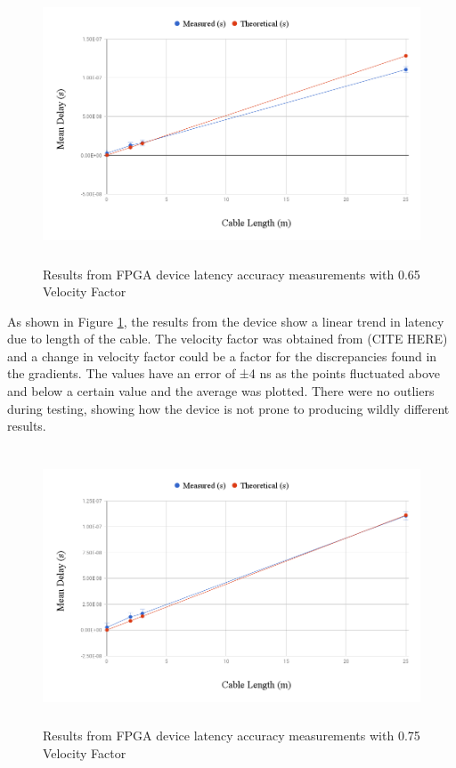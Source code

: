 \begin{figure}[H]
    \begin{center}
        \includegraphics[keepaspectratio,height=8.2cm]{Images/CableTesting}
        \caption{Results from FPGA device latency accuracy measurements with 0.65 Velocity Factor}
        \label{fig:cableTesting}
    \end{center}
\end{figure}

As shown in Figure \ref{fig:cableTesting}, the results from the device show a linear trend in latency due to length 
of the cable. The velocity factor was obtained from (CITE HERE) and a change in velocity factor could be a factor 
for the discrepancies found in the gradients. The values have an error of ±4 ns as the points fluctuated above and 
below a certain value and the average was plotted. There were no outliers during testing, showing how the device is 
not prone to producing wildly different results.

\begin{figure}[H]
    \begin{center}
        \includegraphics[keepaspectratio,height=8.2cm]{Images/CableTesting075}
        \caption{Results from FPGA device latency accuracy measurements with 0.75 Velocity Factor}
        \label{fig:cableTesting075}
    \end{center}
\end{figure}

